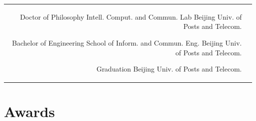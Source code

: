\documentclass[10pt]{article} %
\begin{document}
\begin{paracol}{2}



\begin{supertabular}{rl} %

	
	{Doctor of Philosophy} %
	{} %
	{Intell. Comput. and Commun. Lab} %
	{Beijing Univ. of Posts and Telecom.} %
	
	
	{Bachelor of Engineering} %
	{} %
	{School of Inform. and Commun. Eng.} %
	{Beijing Univ. of Posts and Telecom.} %
	
	{Graduation}%
	{} %
	{} %
	{Beijing Univ. of Posts and Telecom.} %
\end{supertabular}


\section{Awards}






\end{paracol}
\end{document}
